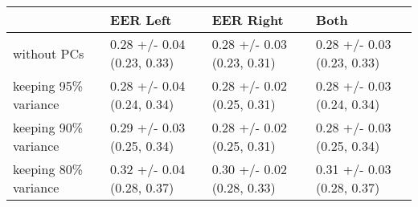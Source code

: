 \begin{tabular}{llll}
\toprule
{} &                    EER Left &                   EER Right &                        Both \\
\midrule
without PCs          &  0.28 +/- 0.04 (0.23, 0.33) &  0.28 +/- 0.03 (0.23, 0.31) &  0.28 +/- 0.03 (0.23, 0.33) \\
keeping 95\% variance &  0.28 +/- 0.04 (0.24, 0.34) &  0.28 +/- 0.02 (0.25, 0.31) &  0.28 +/- 0.03 (0.24, 0.34) \\
keeping 90\% variance &  0.29 +/- 0.03 (0.25, 0.34) &  0.28 +/- 0.02 (0.25, 0.31) &  0.28 +/- 0.03 (0.25, 0.34) \\
keeping 80\% variance &  0.32 +/- 0.04 (0.28, 0.37) &  0.30 +/- 0.02 (0.28, 0.33) &  0.31 +/- 0.03 (0.28, 0.37) \\
\bottomrule
\end{tabular}
